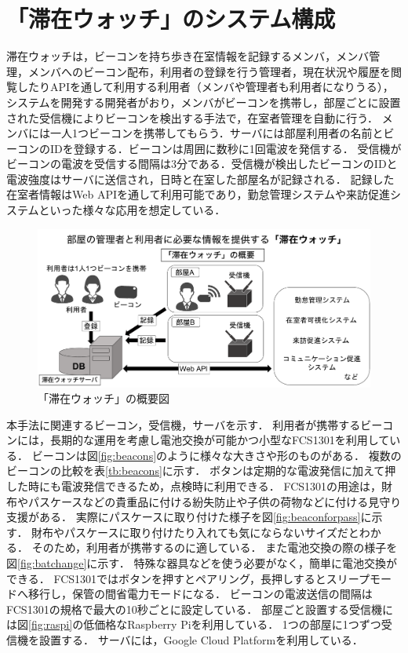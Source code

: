 

\section{「滞在ウォッチ」のシステム構成}\label{3.1}
滞在ウォッチは，ビーコンを持ち歩き在室情報を記録するメンバ，メンバ管理，メンバへのビーコン配布，利用者の登録を行う管理者，現在状況や履歴を閲覧したりAPIを通して利用する利用者（メンバや管理者も利用者になりうる），システムを開発する開発者がおり，メンバがビーコンを携帯し，部屋ごとに設置された受信機によりビーコンを検出する手法で，在室者管理を自動に行う．
メンバには一人1つビーコンを携帯してもらう．サーバには部屋利用者の名前とビーコンのIDを登録する．ビーコンは周囲に数秒に1回電波を発信する．
受信機がビーコンの電波を受信する間隔は3分である．受信機が検出したビーコンのIDと電波強度はサーバに送信され，日時と在室した部屋名が記録される．
記録した在室者情報はWeb APIを通して利用可能であり，勤怠管理システムや来訪促進システムといった様々な応用を想定している．

\begin{figure}[h]
  \centering  %
  \includegraphics[clip,scale = 0.45]{image/platform-idea.pdf}
  \caption{「滞在ウォッチ」の概要図}    \label{StayWatchOverview}
\end{figure}

本手法に関連するビーコン，受信機，サーバを示す．
利用者が携帯するビーコンには，長期的な運用を考慮し電池交換が可能かつ小型なFCS1301\cite{fcs1301}を利用している．
ビーコンは図\ref{fig:beacons}のように様々な大きさや形のものがある．
複数のビーコンの比較を表\ref{tb:beacons}に示す．
ボタンは定期的な電波発信に加えて押した時にも電波発信できるため，点検時に利用できる．
FCS1301の用途は，財布やパスケースなどの貴重品に付ける紛失防止や子供の荷物などに付ける見守り支援がある．
実際にパスケースに取り付けた様子を図\ref{fig:beaconforpass}に示す．
財布やパスケースに取り付けたり入れても気にならないサイズだとわかる．
そのため，利用者が携帯するのに適している．
また電池交換の際の様子を図\ref{fig:batchange}に示す．
特殊な器具などを使う必要がなく，簡単に電池交換ができる．
FCS1301ではボタンを押すとペアリング，長押しするとスリープモードへ移行し，保管の間省電力モードになる．
ビーコンの電波送信の間隔はFCS1301の規格で最大の10秒ごとに設定している．
部屋ごと設置する受信機には図\ref{fig:raspi}の低価格なRaspberry Pi\cite{raspi}を利用している．
1つの部屋に1つずつ受信機を設置する．
サーバには，Google Cloud Platform\cite{gcp}を利用している．

